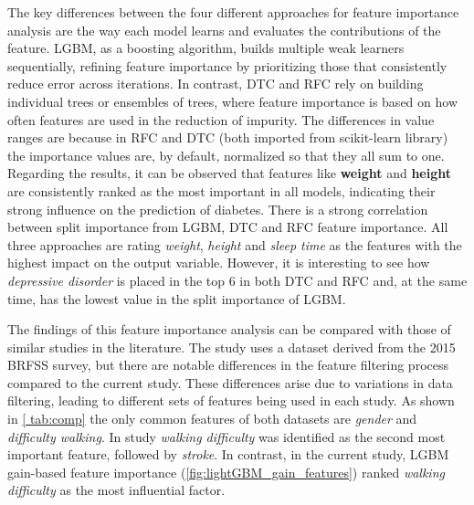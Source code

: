 \documentclass[runningheads]{llncs}
\begin{document}
The key differences between the four different approaches for feature importance analysis are the way each model learns and evaluates the contributions of the feature. LGBM, as a boosting algorithm, builds multiple weak learners sequentially, refining feature importance by prioritizing those that consistently reduce error across iterations. In contrast, DTC and RFC rely on building individual trees or ensembles of trees, where feature importance is based on how often features are used in the reduction of impurity. 
The differences in value ranges are because in RFC and DTC (both imported from scikit-learn library) the importance values are, by default, normalized so that they all sum to one.
Regarding the results, it can be observed that features like \textbf{weight} and \textbf{height} are consistently ranked as the most important in all models, indicating their strong influence on the prediction of diabetes.
There is a strong correlation between split importance from LGBM, DTC and RFC feature importance. All three approaches are rating \textit{weight}, \textit{height} and \textit{sleep time} as the features with the highest impact on the output variable. However, it is interesting to see how \textit{depressive disorder} is placed in the top 6 in both DTC and RFC and, at the same time, has the lowest value in the split importance of LGBM.

The findings of this feature importance analysis can be compared with those of similar studies in the literature. 
The study \cite{Xu2024} uses a dataset derived from the 2015 BRFSS survey, but there are notable differences in the feature filtering process compared to the current study. These differences arise due to variations in data filtering, leading to different sets of features being used in each study. As shown in \autoref{ tab:comp} the only common features of both datasets are \textit{gender} and \textit{difficulty walking}. In study \cite{Xu2024} \textit{walking difficulty}  was identified as the second most important feature, followed by \textit{stroke}. In contrast, in the current study, LGBM gain-based feature importance (\autoref{fig:lightGBM_gain_features}) ranked \textit{walking difficulty} as the most influential factor. 
\end{document}
